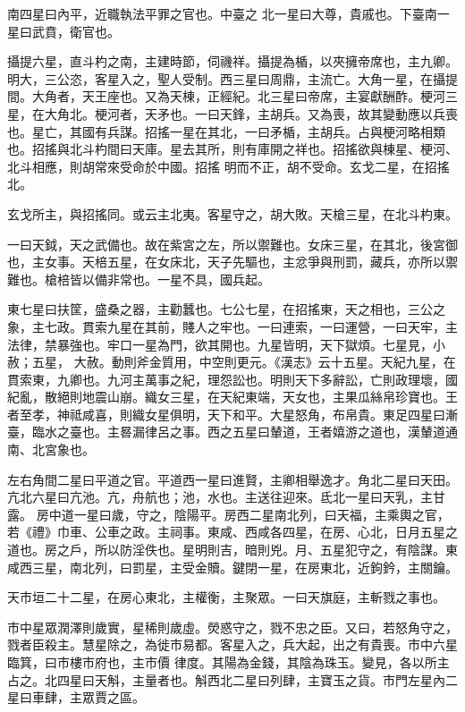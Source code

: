 \begin{pinyinscope}
 南四星曰內平，近職執法平罪之官也。中臺之
 北一星曰大尊，貴戚也。下臺南一星曰武賁，衛官也。



 攝提六星，直斗杓之南，主建時節，伺禨祥。攝提為楯，以夾擁帝席也，主九卿。明大，三公恣，客星入之，聖人受制。西三星曰周鼎，主流亡。大角一星，在攝提間。大角者，天王座也。又為天棟，正經紀。北三星曰帝席，主宴獻酬酢。梗河三星，在大角北。梗河者，天矛也。一曰天鋒，主胡兵。又為喪，故其變動應以兵喪也。星亡，其國有兵謀。招搖一星在其北，一曰矛楯，主胡兵。占與梗河略相類也。招搖與北斗杓間曰天庫。星去其所，則有庫開之祥也。招搖欲與棟星、梗河、北斗相應，則胡常來受命於中國。招搖
 明而不正，胡不受命。玄戈二星，在招搖北。



 玄戈所主，與招搖同。或云主北夷。客星守之，胡大敗。天槍三星，在北斗杓東。



 一曰天鉞，天之武備也。故在紫宮之左，所以禦難也。女床三星，在其北，後宮御也，主女事。天棓五星，在女床北，天子先驅也，主忿爭與刑罰，藏兵，亦所以禦難也。槍棓皆以備非常也。一星不具，國兵起。



 東七星曰扶筐，盛桑之器，主勸蠶也。七公七星，在招搖東，天之相也，三公之象，主七政。貫索九星在其前，賤人之牢也。一曰連索，一曰運營，一曰天牢，主法律，禁暴強也。牢口一星為門，欲其開也。九星皆明，天下獄煩。七星見，小赦；五星，
 大赦。動則斧金質用，中空則更元。《漢志》云十五星。天紀九星，在貫索東，九卿也。九河主萬事之紀，理怨訟也。明則天下多辭訟，亡則政理壞，國紀亂，散絕則地震山崩。織女三星，在天紀東端，天女也，主果瓜絲帛珍寶也。王者至孝，神祗咸喜，則織女星俱明，天下和平。大星怒角，布帛貴。東足四星曰漸臺，臨水之臺也。主晷漏律呂之事。西之五星曰輦道，王者嬉游之道也，漢輦道通南、北宮象也。



 左右角間二星曰平道之官。平道西一星曰進賢，主卿相舉逸才。角北二星曰天田。亢北六星曰亢池。亢，舟航也；池，水也。主送往迎來。氐北一星曰天乳，主甘露。
 房中道一星曰歲，守之，陰陽平。房西二星南北列，曰天福，主乘輿之官，若《禮》巾車、公車之政。主祠事。東咸、西咸各四星，在房、心北，日月五星之道也。房之戶，所以防淫佚也。星明則吉，暗則兇。月、五星犯守之，有陰謀。東咸西三星，南北列，曰罰星，主受金贖。鍵閉一星，在房東北，近鉤鈐，主關鑰。



 天市垣二十二星，在房心東北，主權衡，主聚眾。一曰天旗庭，主斬戮之事也。



 市中星眾潤澤則歲實，星稀則歲虛。熒惑守之，戮不忠之臣。又曰，若怒角守之，戮者臣殺主。慧星除之，為徙市易都。客星入之，兵大起，出之有貴喪。市中六星臨箕，曰市樓市府也，主市價
 律度。其陽為金錢，其陰為珠玉。變見，各以所主占之。北四星曰天斛，主量者也。斛西北二星曰列肆，主寶玉之貨。市門左星內二星曰車肆，主眾賈之區。




\end{pinyinscope}
